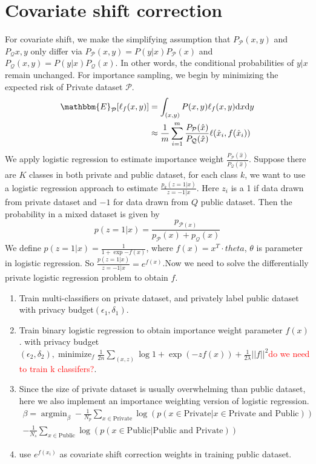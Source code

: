 \documentclass{article}
\newcommand{\argmin}{\mathop{\mathrm{argmin}}}
\newcommand{\minimize}{\mathop{\mathrm{minimize}}}
\newcommand{\red}[1]{\textcolor{red}{#1}}
\def\cP{\mathcal{P}}
\def\cQ{\mathcal{Q}}
\theoremstyle{definition}
\begin{document}
\section{Covariate shift correction}
For covariate shift, we make the simplifying assumption that $P_{\cP}(x,y)$ and $P_{\cQ}{x,y}$ only differ via $P_{\cP}(x,y) = P(y|x)P_{\cP}(x)$ and $P_{\cQ}(x,y) = P(y|x)P_{\cQ}(x)$. In other words, the conditional probabilities of $y|x$ remain unchanged. For importance sampling, we begin by minimizing the expected risk of Private dataset $\cP$.
\begin{align*}
\mathbbm{E}_{\mathcal{P}}[\ell_f(x,y)]&=\int_{(x,y)}P(x,y)\ell_f(x,y){\rm d}x{\rm d}y\\
&\approx \frac{1}{m}\sum_{i=1}^m \frac{P_\mathcal{P}(\hat{x})}{P_\mathcal{Q}(\hat{x})}\ell(\hat{x}_i,f(\hat{x}_i))
\end{align*}
We apply logistic regression to estimate importance weight $\frac{P_\mathcal{P}(\hat{x})}{P_\mathcal{Q}(\hat{x})}$. Suppose there are $K$ classes in both private and public dataset, for each class $k$, we want to use a logistic regression approach to estimate $\frac{p_k(z=1|x)}{z=-1|x}$. Here $z_i$ is a 1 if data drawn from private dataset and $-1$ for data drawn from $Q$ public dataset. Then the probability in a mixed dataset is given by
$$
p(z=1|x) =\frac{p_{\cP(x)}}{p_\cP(x)+p_\cQ(x)}
$$
We define $p(z=1|x) = \frac{1}{1+\exp{-f(x)}}$, where $f(x) = x^T \cdot theta$, $\theta$ is parameter in logistic regression.  So $\frac{p(z=1|x)}{z=-1|x} = e^{f(x)}$.Now we need to solve the differentially private logistic regression problem to obtain $f$.
\begin{enumerate}
	\item Train multi-classifiers on private dataset, and privately label public dataset with privacy budget$(\epsilon_1, \delta_1)$.
	\item Train binary logistic regression to obtain importance weight parameter $f(x)$.
	with privacy budget$(\epsilon_2, \delta_2),\minimize_f \frac{1}{2n} \sum_{(x,z)} \log{1 + \exp(-zf(x))} +\frac{1}{2\lambda}||f||^2 $\red{do we need to train k classifers?}. 
	\item Since the size of private dataset is usually overwhelming than public dataset, here we also implement an importance weighting version of logistic regression.
	\begin{align*}
	  \beta = \argmin_\beta -\frac{1}{N_p} \sum_{x\in \text{Private}} \log( p( x\in \text{Private} | x \in \text{Private and Public}))\\
  - \frac{1}{N_s}\sum_{x \in \text{Public}} \log(p(x \in \text{Public} |\text{Public and Private}))
	\end{align*}
	\item use $e^{f(x_i)}$ as covariate shift correction weights in training public dataset.
\end{enumerate}
\end{document}
